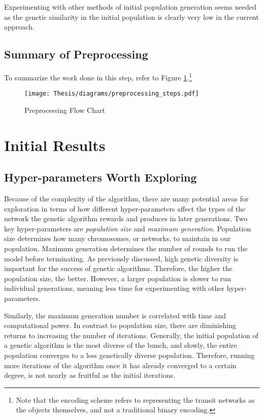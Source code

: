 \documentclass[11pt]{amsart}
\theoremstyle{definition}                  %
\theoremstyle{remark}                       %
\numberwithin{equation}{section}
\begin{document}
Experimenting with other methods of initial population generation seems needed as the genetic similarity in the initial population is clearly very low in the current approach. 


\subsection{Summary of Preprocessing}
To summarize the work done in this step, refer to Figure \ref{diagram:Preprocessing}.\footnote{Note that the encoding scheme refers to representing the transit networks as the objects themselves, and not a traditional binary encoding.}
\begin{figure}[h]
    \centering
    \texttt{[image: Thesis/diagrams/preprocessing\_steps.pdf]}
    \caption{Preprocessing Flow Chart}
    \label{diagram:Preprocessing}
\end{figure}

\section{Initial Results}

\subsection{Hyper-parameters Worth Exploring}
Because of the complexity of the algorithm, there are many potential areas for exploration in terms of how different hyper-parameters affect the types of the network the genetic algorithm rewards and produces in later generations. Two key hyper-parameters are \textit{population size} and \textit{maximum generation}. Population size determines how many chromosomes, or networks, to maintain in our population. Maximum generation determines the number of rounds to run the model before terminating. As previously discussed, high genetic diversity is important for the success of genetic algorithms. Therefore, the higher the population size, the better. However, a larger population is slower to run individual generations, meaning less time for experimenting with other hyper-parameters. 

Similarly, the maximum generation number is correlated with time and computational power. In contrast to population size, there are diminishing returns to increasing the number of iterations. Generally, the initial population of a genetic algorithm is the most diverse of the bunch, and slowly, the entire population converges to a less genetically diverse population. Therefore, running more iterations of the algorithm once it has already converged to a certain degree, is not nearly as fruitful as the initial iterations. 
\end{document}
